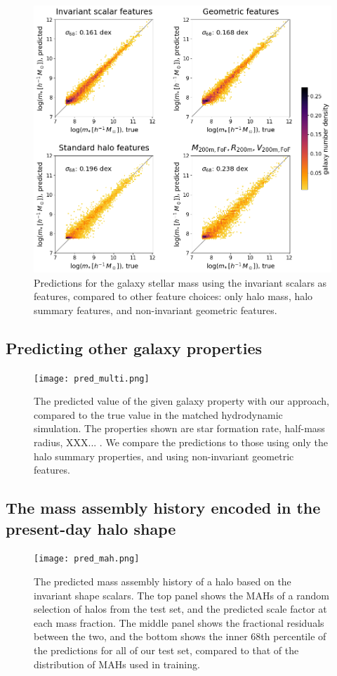 \begin{figure}
    \centering
    \includegraphics[width=0.7\columnwidth]{feature_comparison_mstellar.png}
    \caption{Predictions for the galaxy stellar mass using the invariant scalars as features, compared to other feature choices: only halo mass, halo summary features, and non-invariant geometric features.}
    \label{fig:mstellar_compare}
\end{figure}


\subsection{Predicting other galaxy properties}

\begin{figure}
    \centering
    \texttt{[image: pred\_multi.png]}
    \caption{The predicted value of the given galaxy property with our approach, compared to the true value in the matched hydrodynamic simulation. The properties shown are star formation rate, half-mass radius, XXX... . We compare the predictions to those using only the halo summary properties, and using non-invariant geometric features.}
    \label{fig:gal_props}
\end{figure}


\subsection{The mass assembly history encoded in the present-day halo shape}


\begin{figure}
    \centering
    \texttt{[image: pred\_mah.png]}
    \caption{The predicted mass assembly history of a halo based on the invariant shape scalars. The top panel shows the MAHs of a random selection of halos from the test set, and the predicted scale factor at each mass fraction. The middle panel shows the fractional residuals between the two, and the bottom shows the inner 68th percentile of the predictions for all of our test set, compared to that of the distribution of MAHs used in training. }
    \label{fig:mah}
\end{figure}


